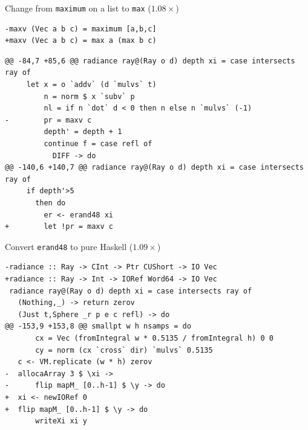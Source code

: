 \documentclass[8pt]{beamer}
\begin{document}
\begin{frame}[fragile]{Change from \texttt{maximum} on a list to \texttt{max} ($1.08\times$)}
\begin{verbatim}
-maxv (Vec a b c) = maximum [a,b,c]
+maxv (Vec a b c) = max a (max b c)
\end{verbatim}

\begin{verbatim}
@@ -84,7 +85,6 @@ radiance ray@(Ray o d) depth xi = case intersects ray of
     let x = o `addv` (d `mulvs` t)
         n = norm $ x `subv` p
         nl = if n `dot` d < 0 then n else n `mulvs` (-1)
-        pr = maxv c
         depth' = depth + 1
         continue f = case refl of
           DIFF -> do
@@ -140,6 +140,7 @@ radiance ray@(Ray o d) depth xi = case intersects ray of
     if depth'>5
       then do
         er <- erand48 xi
+        let !pr = maxv c
\end{verbatim}

\end{frame}



\begin{frame}[fragile]{Convert \texttt{erand48} to pure Haskell ($1.09\times$)}
\begin{verbatim}
-radiance :: Ray -> CInt -> Ptr CUShort -> IO Vec
+radiance :: Ray -> Int -> IORef Word64 -> IO Vec
 radiance ray@(Ray o d) depth xi = case intersects ray of
   (Nothing,_) -> return zerov
   (Just t,Sphere _r p e c refl) -> do
@@ -153,9 +153,8 @@ smallpt w h nsamps = do
       cx = Vec (fromIntegral w * 0.5135 / fromIntegral h) 0 0
       cy = norm (cx `cross` dir) `mulvs` 0.5135
   c <- VM.replicate (w * h) zerov
-  allocaArray 3 $ \xi ->
-      flip mapM_ [0..h-1] $ \y -> do
+  xi <- newIORef 0
+  flip mapM_ [0..h-1] $ \y -> do
       writeXi xi y
\end{verbatim}
\end{frame}
\end{document}
